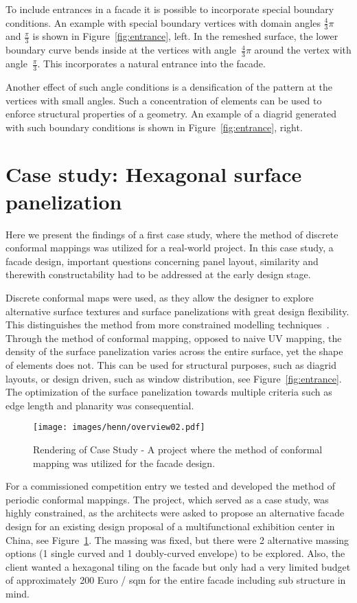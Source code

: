 \documentclass[Thesis.tex]{subfiles}
\begin{document}
To include entrances in a facade it is possible to incorporate special 
boundary conditions. An example with special boundary vertices with domain angles
$\frac{4}{3}\pi$ and $\tfrac{\pi}{3}$ is shown in
Figure~\ref{fig:entrance}, left. In the remeshed surface, the lower boundary
curve bends inside at the vertices with angle~$\tfrac{4}{3}\pi$ around
the vertex with angle~$\tfrac{\pi}{3}$. This incorporates a natural
entrance into the facade.

Another effect of such angle conditions is a densification of the
pattern at the vertices with small angles. Such a concentration of
elements can be used to enforce structural properties of a
geometry. An example of a diagrid generated with such boundary
conditions is shown in Figure~\ref{fig:entrance}, right.


\section{Case study: Hexagonal surface panelization}
\label{sec:panelization}
Here we present the findings of a first case study, where the method
of discrete conformal mappings was utilized for a real-world project.
In this case study, a facade design, important questions concerning
panel layout, similarity and therewith constructability had to be
addressed at the early design stage.

Discrete conformal maps were used, as they allow the designer to
explore alternative surface textures and surface panelizations with
great design flexibility. This distinguishes the method from more
constrained modelling techniques~\cite{GlymphSCMS2004}. Through the method of
conformal mapping, opposed to naive UV mapping, the density of the
surface panelization varies across the entire surface, yet the shape
of elements does not. This can be used for structural purposes, such
as diagrid layouts, or design driven, such as window distribution, see 
Figure~\ref{fig:entrance}. The optimization of the surface panelization 
towards multiple criteria such as edge length and planarity was 
consequential.

\begin{figure}[t]
  \centering
  \texttt{[image: images/henn/overview02.pdf]}
  \caption{Rendering of Case Study - A project where the method of
    conformal mapping was utilized for the facade design.}
  \label{fig:overview02}
\end{figure}

For a commissioned competition entry we tested and developed the
method of periodic conformal mappings. The project, which served as a
case study, was highly constrained, as the architects were asked to
propose an alternative facade design for an existing design proposal
of a multifunctional exhibition center in China, see
Figure~\ref{fig:overview02}. The massing was fixed, but there were 2
alternative massing options (1 single curved and 1 doubly-curved
envelope) to be explored. Also, the client wanted a hexagonal tiling
on the facade but only had a very limited budget of approximately 200
Euro / sqm for the entire facade including sub structure in mind.
\end{document}
